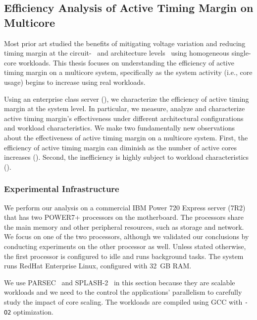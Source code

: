 \subsection{Efficiency Analysis of Active Timing Margin on Multicore}
\label{sec:ams:characterization}

Most prior art studied the benefits of mitigating voltage variation and reducing timing margin at the circuit-~\cite{kurd2008next,bowman201222nm,grenat20145,tokunaga20145,bowman20158} and architecture levels~\cite{lefurgy2011active,reddi2009voltage, gupta2008decor, powell2003pipeline,reddi2010voltage, bertran2014voltage} using homogeneous single-core workloads. This thesis focuses on understanding the efficiency of active timing margin on a multicore system, specifically as the system activity (i.e., core usage) begins to increase using real workloads.

Using an enterprise class server (), we characterize the efficiency of active timing margin at the system level. In particular, we measure, analyze and characterize active timing margin's effectiveness under different architectural configurations and workload characteristics. We make two fundamentally new observations about the effectiveness of active timing margin on a multicore system. First, the efficiency of active timing margin can diminish as the number of active cores increases (). Second, the inefficiency is highly subject to workload characteristics ().

\subsubsection{Experimental Infrastructure}
\label{sec:ams:characterization:setup}
 
We perform our analysis on a commercial IBM Power 720 Express server (7R2) that has two POWER7+ processors on the motherboard. The processors share the main memory and other peripheral resources, such as storage and network. We focus on one of the two processors, although we validated our conclusions by conducting experiments on the other processor as well. Unless stated otherwise, the first processor is configured to idle and runs background tasks. The system runs RedHat Enterprise Linux, configured with 32~GB RAM. 

We use PARSEC~\cite{bienia2008parsec} and SPLASH-2~\cite{woo1995splash,bienia2008parsecsplash} in this section because they are scalable workloads and we need to the control the applications' parallelism to carefully study the impact of core scaling. The workloads are compiled using GCC with \texttt{-O2} optimization.

